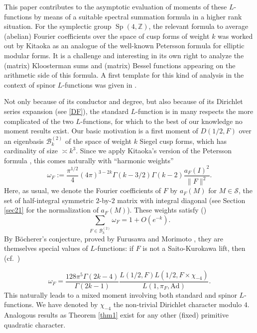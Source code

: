 \documentclass[11pt]{amsart}
\numberwithin{equation}{section}
\theoremstyle{plain}
\theoremstyle{definition}
\newcommand{\Z}{\mathbb{Z}}
\newcommand{\Sp}{\operatorname{Sp}}
\numberwithin{equation}{section}
\begin{document}
  This paper contributes to the asymptotic evaluation of moments of these $L$-functions by means of a suitable spectral summation formula in a higher rank situation. 
  For the symplectic group $\Sp(4,\Z)$, the relevant formula to average (abelian) Fourier coefficients over the space of cusp  forms of weight $k$ was worked out by Kitaoka \cite{Ki} as an analogue of the well-known Petersson formula for elliptic modular forms. It is a challenge and interesting in its own right to analyze the (matrix) Kloosterman sums and (matrix) Bessel functions appearing on the arithmetic side of this formula. %
  A first template for this kind of analysis in the context of spinor $L$-functions was given in \cite{Bl}. 
  
  Not only because of its conductor and degree, but also because of its Dirichlet series expansion (see \eqref{DF}), the standard $L$-function is in many respects the more complicated of the two $L$-functions, for which to the best of our knowledge no moment results exist. %
  Our basic motivation is a first moment of $D(1/2, F)$ over an eigenbasis $\mathcal{B}^{(2)}_k$ of the space of weight $k$ Siegel cusp forms, which has cardinality of size $
\asymp k^3$. Since we apply Kitaoka's version of the Petersson formula \cite{Ki}, this comes naturally with ``harmonic weights''
$$\omega_F := \frac{\pi^{1/2}}{4} (4\pi)^{3 - 2k} \Gamma(k-3/2)\Gamma(k-2) \frac{a_F(I)^2}{\| F \|^2}. $$
Here, as usual, we denote the Fourier coefficients of $F$ by $a_F(M)$ for $M \in \mathcal{S}$, the set of half-integral symmetric $2$-by-$2$ matrix with integral diagonal (see Section \ref{sec21} for the normalization of $a_F(M)$).
These weights satisfy (\cite[(1.8)]{Bl})
\[
\sum_{F \in \mathcal{B}_k^{(2)}} \omega_F = 1 + O(e^{-k}).
\]
By B\"ocherer's conjecture, proved by Furusawa and Morimoto \cite{FS}, they are themselves special values of $L$-functions: if $F$ is not a Saito-Kurokawa lift, then (cf.\ \cite[Theorem 1.2]{DPSS})

\begin{equation}\label{dpssth12}
 \omega_F = \frac{128\pi^5 \Gamma(2k-4)}{\Gamma(2k-1)} \frac{L(1/2, F)  L(1/2, F \times \chi_{-4} )    }{L(1, \pi_F, \text{Ad})}.
 \end{equation}
 This  naturally leads to a mixed moment involving both standard and spinor $L$-functions. We have denoted by  $\chi_{-4}$   the non-trivial Dirichlet character modulo $4$. Analogous results as Theorem \ref{thm1} exist for any other (fixed) primitive  quadratic character. 
 
\end{document}
